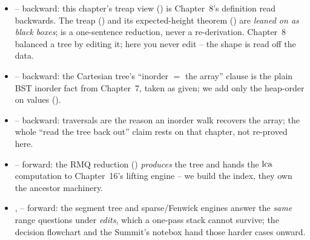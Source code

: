 
\begin{itemize}[nosep, leftmargin=1.4em]
  \item {} -- backward: this chapter's treap view () is Chapter~8's
        definition read backwards. The treap () and its expected-height theorem
        () are \emph{leaned on as black boxes};  is a one-sentence
        reduction, never a re-derivation. Chapter~8 balanced a tree by editing it; here you never edit -- the
        shape is read off the data.
  \item {} -- backward: the Cartesian tree's ``inorder $=$ the array'' clause is the plain BST
        inorder fact from Chapter~7, taken as given; we add only the heap-order on values
        ().
  \item {} -- backward: traversals are the reason an inorder walk recovers the array; the whole
        ``read the tree back out'' claim rests on that chapter, not re-proved here.
  \item {} -- forward: the RMQ reduction () \emph{produces} the tree and hands
        the $\operatorname{lca}$ computation to Chapter~16's lifting engine -- we build the index, they own the ancestor
        machinery.
  \item {},  -- forward: the segment tree and sparse/Fenwick engines answer the
        \emph{same} range questions under \emph{edits}, which a one-pass stack cannot survive; the decision
        flowchart and the Summit's notebox hand those harder cases onward.
\end{itemize}

